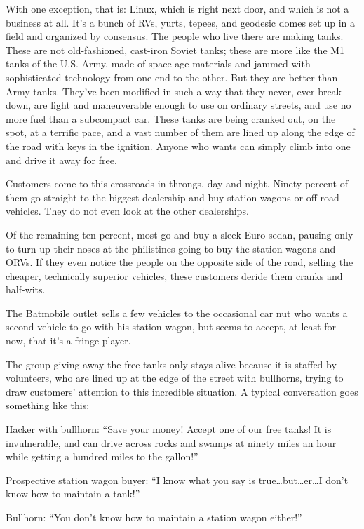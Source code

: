 \documentclass[
  fontsize=11pt,
  paper=landscape,
  twocolumn=true,
  pagesize=pdftex,
  headings=small,
  DIV=15,
  ]{scrartcl}
\begin{document}
With one exception, that is: Linux, which is right next door, and which
is not a business at all. It's a bunch of RVs, yurts, tepees, and
geodesic domes set up in a field and organized by consensus. The people
who live there are making tanks. These are not old-fashioned, cast-iron
Soviet tanks; these are more like the M1 tanks of the U.S. Army, made of
space-age materials and jammed with sophisticated technology from one
end to the other. But they are better than Army tanks. They've been
modified in such a way that they never, ever break down, are light and
maneuverable enough to use on ordinary streets, and use no more fuel
than a subcompact car. These tanks are being cranked out, on the spot,
at a terrific pace, and a vast number of them are lined up along the
edge of the road with keys in the ignition. Anyone who wants can simply
climb into one and drive it away for free.

Customers come to this crossroads in throngs, day and night. Ninety
percent of them go straight to the biggest dealership and buy station
wagons or off-road vehicles. They do not even look at the other
dealerships.

Of the remaining ten percent, most go and buy a sleek Euro-sedan,
pausing only to turn up their noses at the philistines going to buy the
station wagons and ORVs. If they even notice the people on the opposite
side of the road, selling the cheaper, technically superior vehicles,
these customers deride them cranks and half-wits.

The Batmobile outlet sells a few vehicles to the occasional car nut who
wants a second vehicle to go with his station wagon, but seems to
accept, at least for now, that it's a fringe player.

The group giving away the free tanks only stays alive because it is
staffed by volunteers, who are lined up at the edge of the street with
bullhorns, trying to draw customers' attention to this incredible
situation. A typical conversation goes something like this:

Hacker with bullhorn: ``Save your money! Accept one of our free tanks!
It is invulnerable, and can drive across rocks and swamps at ninety
miles an hour while getting a hundred miles to the gallon!''

Prospective station wagon buyer: ``I know what you say is
true\ldots{}but\ldots{}er\ldots{}I don't know how to maintain a tank!''

Bullhorn: ``You don't know how to maintain a station wagon either!''
\end{document}
